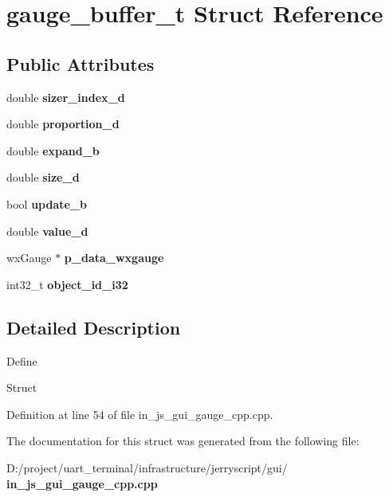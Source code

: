 \section{gauge\+\_\+buffer\+\_\+t Struct Reference}
\label{structgauge__buffer__t}
\subsection*{Public Attributes}
\begin{DoxyCompactItemize}
\item 
\mbox{\label{structgauge__buffer__t_a0be9a343b92e0fee7a164df14a16b965}} 
double {\bfseries sizer\+\_\+index\+\_\+d}
\item 
\mbox{\label{structgauge__buffer__t_a7150915dcfe85199c33e078a97ff0953}} 
double {\bfseries proportion\+\_\+d}
\item 
\mbox{\label{structgauge__buffer__t_af62b470e46304cf918f75cc3769740ad}} 
double {\bfseries expand\+\_\+b}
\item 
\mbox{\label{structgauge__buffer__t_a1cc595efed5ac3a41030c43e484e2215}} 
double {\bfseries size\+\_\+d}
\item 
\mbox{\label{structgauge__buffer__t_aa85275c3dd812dc74dd57b211a7dcdc6}} 
bool {\bfseries update\+\_\+b}
\item 
\mbox{\label{structgauge__buffer__t_a1a2f741aedb3ac18de168358cb327b26}} 
double {\bfseries value\+\_\+d}
\item 
\mbox{\label{structgauge__buffer__t_a36ddd7c20574ad094dd1b7e58d43cc1b}} 
wx\+Gauge $\ast$ {\bfseries p\+\_\+data\+\_\+wxgauge}
\item 
\mbox{\label{structgauge__buffer__t_aca01c3b1d05d9722abac5a58d7ede71a}} 
int32\+\_\+t {\bfseries object\+\_\+id\+\_\+i32}
\end{DoxyCompactItemize}


\subsection{Detailed Description}
Define

Struct 

Definition at line 54 of file in\+\_\+js\+\_\+gui\+\_\+gauge\+\_\+cpp.\+cpp.



The documentation for this struct was generated from the following file\+:\begin{DoxyCompactItemize}
\item 
D\+:/project/uart\+\_\+terminal/infrastructure/jerryscript/gui/\textbf{ in\+\_\+js\+\_\+gui\+\_\+gauge\+\_\+cpp.\+cpp}\end{DoxyCompactItemize}
